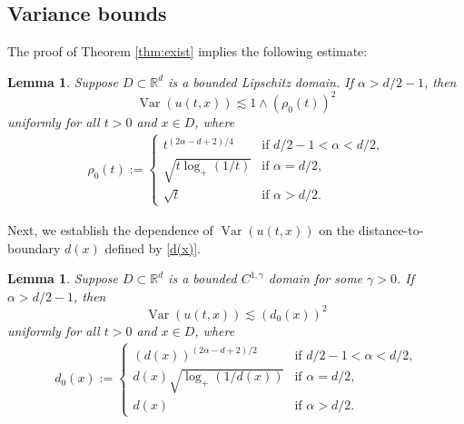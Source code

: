 \documentclass[reqno]{amsart}
\DeclareMathOperator{\Var}{Var}
\newcommand{\R}{\mathbb R}
\newcommand{\1}{\mathbf 1}
\numberwithin{equation}{section}
\newtheorem{lemma}[theorem]{Lemma}
\theoremstyle{definition}
\begin{document}
\subsection{Variance bounds}

The proof of Theorem \ref{thm:exist} implies the following estimate:

\begin{lemma}\label{lem:var:u:1}
    Suppose $D \subset \R^d$ is a bounded Lipschitz domain. If $\alpha>d/2-1$, then 
\[
	\Var(u(t,x)) \lesssim 1 \wedge (\rho_0(t))^2
\]
uniformly for all $t>0$ and $x \in D$, where
\begin{align}\label{rho_0}
	\rho_0(t)
	:= \begin{cases}
	t^{(2\alpha-d+2)/4} & \text{if $d/2-1<\alpha<d/2$,}\\
	\sqrt{t \log_+(1/t)}& \text{if $\alpha = d/2$,}\\
	\sqrt{t} & \text{if $\alpha > d/2$.}
	\end{cases}
\end{align}
\end{lemma}


Next, we establish the dependence of $\Var(u(t,x))$ on the distance-to-boundary $d(x)$ defined by \eqref{d(x)}.

\begin{lemma}\label{lem:var:u:2}
Suppose $D \subset \R^d$ is a bounded $C^{1,\gamma}$ domain for some $\gamma>0$. If $\alpha>d/2-1$, then 
\[
	\Var(u(t,x)) \lesssim (d_0(x))^2
\]
uniformly for all $t>0$ and $x \in D$, where
\begin{align}\label{d_0}
d_0(x):=\begin{cases}
(d(x))^{(2\alpha-d+2)/2}  & \text{if $d/2-1<\alpha<d/2$,}\\
d(x)\sqrt{\log_+(1/d(x))} & \text{if $\alpha = d/2$,}\\
d(x)& \text{if $\alpha > d/2$.}
\end{cases}
\end{align}
\end{lemma}
\end{document}
